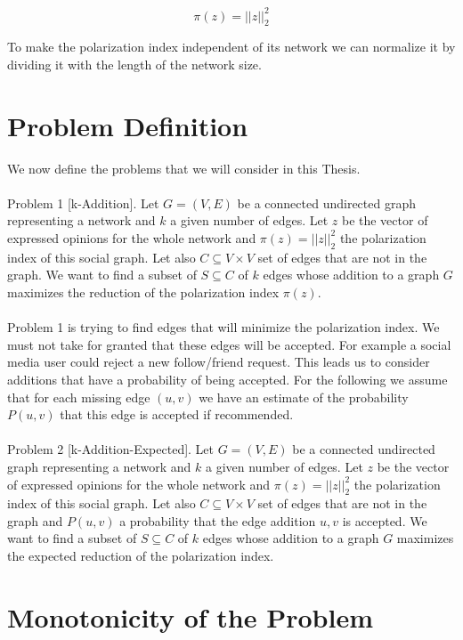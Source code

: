 \begin{equation}
	\pi(z) = ||z||_{2}^2
\end{equation}
\vspace{25pt}

\noindent To make the polarization index independent of its network we can normalize it by dividing it with the length of the network size. 
\clearpage

\section{Problem Definition}
\label{sec:problemDef}
We now define the problems that we will consider in this Thesis.
\\
\\
\noindent Problem 1 [k-Addition]. \noindent Let $G = (V,E)$ be a connected undirected graph representing a network and $k$ a given number of edges. Let $z$ be the vector of expressed opinions  for the whole network and $\pi(z) = ||z||_{2}^2$ the polarization index of this social graph. Let also $C \subseteq	V \times V$ set of edges that are not in the graph. We want to find a subset of $S \subseteq C$ of $k$ edges whose addition to a graph $G$ maximizes the reduction of the polarization index $\pi(z)$.
\\
\\
\noindent Problem 1 is trying to find edges that will minimize the polarization index. We must not take for granted that these edges will be accepted. 
For example a social media user could reject a new follow/friend request. This leads us to consider additions that have a probability of being accepted. For the following we assume that for each missing edge $(u,v)$ we have an estimate of the probability $P(u,v)$ that this edge is accepted if recommended.
\\
\\
\noindent Problem 2 [k-Addition-Expected]. Let $G = (V,E)$ be a connected undirected graph representing a network and $k$ a given number of edges. Let $z$ be the vector of expressed opinions  for the whole network and $\pi(z) = ||z||_{2}^2$ the polarization index of this social graph. Let also $C \subseteq V \times V$ set of edges that are not in the graph and $P(u,v)$ a probability that the edge addition $u,v$ is accepted. We want to find a subset of $S \subseteq C$ of $k$ edges whose addition to a graph $G$ maximizes the expected reduction of the polarization index.


\section{Monotonicity of the Problem}
\label{sec:monotonicity}


